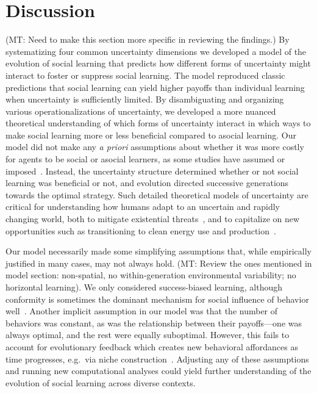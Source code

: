 \documentclass[letterpaper,11.5pt]{scrartcl}
\newcommand{\mt}[1]{{\textcolor{myorange} {({\tiny MT:} #1)}}}
\begin{document}
\section{Discussion}

\mt{Need to make this section more specific in reviewing the findings.}
By systematizing four common uncertainty dimensions we developed a model of
the evolution of social learning that
predicts how different forms of uncertainty might interact to foster or suppress
social learning.  The model reproduced classic predictions that social learning can
yield higher payoffs than individual learning when uncertainty is sufficiently
limited.  By disambiguating and organizing various operationalizations of
uncertainty, we developed a more nuanced theoretical understanding of which forms
of uncertainty interact in which ways to make social learning more or less
beneficial compared to asocial learning.
Our model did not make any \emph{a priori} assumptions about whether it was
more costly for agents to be social or asocial learners, as some studies have
assumed or imposed~\cite{Rogers1988,Feldman1996,Morgan2012}. 
Instead, the uncertainty structure determined whether
or not social learning was beneficial or not, and evolution directed successive
generations towards the optimal strategy.
Such detailed theoretical models of uncertainty
are critical for understanding how humans adapt to an uncertain and
rapidly changing world, both to mitigate existential
threats~\cite{Moya2020,Jones2021}, and to capitalize on new opportunities such as
transitioning to clean energy use and
production~\cite{NatureEnergyEditorialPromisesPremises2018,Brisbois2022}.

Our model necessarily made some simplifying assumptions that, while
empirically justified in many cases, may not always hold.
\mt{Review the ones mentioned in model section: non-spatial, no within-generation
environmental variability; no horizontal learning}.
We only considered
success-biased learning, although conformity is sometimes the dominant mechanism 
for social influence of behavior well~\cite{Muthukrishna2016a,Smaldino2018b}. 
Another implicit assumption
in our model was that the number of behaviors was constant, as was the relationship
between their payoffs---one was always optimal, and the rest were equally
suboptimal. However, this fails to account for evolutionary feedback which creates
new behavioral affordances as time progresses, e.g.\ via niche 
construction~\cite{Smaldino2012,Heras-Escribano2020}. Adjusting any of these
assumptions and running new computational analyses could yield further
understanding of the evolution of social learning across diverse contexts.
\end{document}
